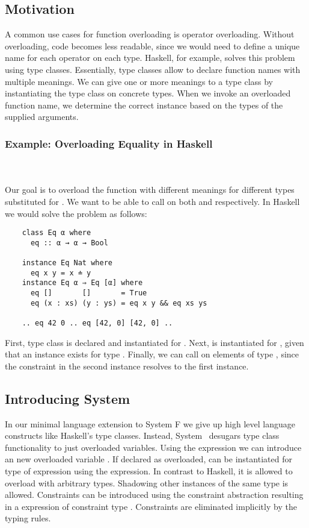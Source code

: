 \subsection{Motivation}
A common use cases for function overloading is operator overloading. Without overloading, code becomes less readable, since we would need to define a unique name for each operator on each type.
Haskell, for example, solves this problem using type classes.
Essentially, type classes allow to declare function names with multiple meanings. We can give one or more meanings to a type class by instantiating the type class on concrete types. 
When we invoke an overloaded function name, we determine the correct instance based on the types of the supplied arguments.
\subsubsection{Example: Overloading Equality in Haskell}\hfill\\\\
Our goal is to overload the function  with different meanings for different types substituted for .
We want to be able to call  on both  and \inl{[Nat]} respectively. In Haskell we would solve the problem as follows:
\begin{verbatim}
    class Eq α where
      eq :: α → α → Bool 

    instance Eq Nat where
      eq x y = x ≐ y
    instance Eq α ⇒ Eq [α] where
      eq []       []       = True
      eq (x : xs) (y : ys) = eq x y && eq xs ys 

    .. eq 42 0 .. eq [42, 0] [42, 0] ..
\end{verbatim}
First, type class  is declared and instantiated for . 
Next,  is instantiated for \inl{[α]}, given that an instance  exists for type . 
Finally, we can call  on elements of type \inl{[Nat]}, since the constraint  in the second instance resolves to the first instance.
\subsection{Introducing System \Fo}
In our minimal language extension to System F we give up high level language constructs like Haskell's type classes. 
Instead, System \Fo\ desugars type class functionality to just overloaded variables. 
Using the  expression we can introduce an new overloaded variable . 
If declared as overloaded,  can be instantiated for type  of expression  using the  expression.
In contrast to Haskell, it is allowed to overload  with arbitrary types. 
Shadowing other instances of the same type is allowed.
Constraints can be introduced using the constraint abstraction  resulting in a expression of constraint type . Constraints are eliminated implicitly by the typing rules.

